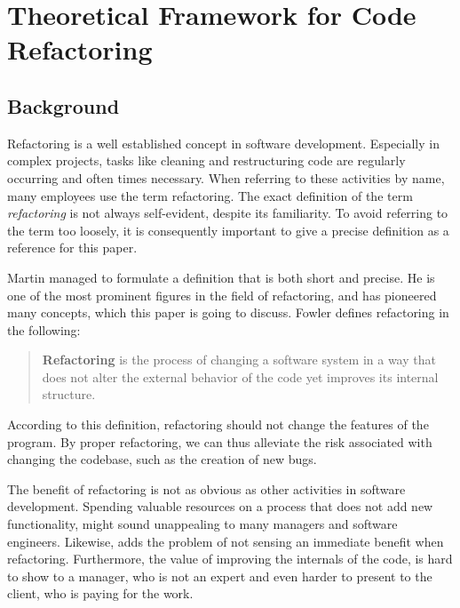 \chapter{Theoretical Framework for Code Refactoring}

\section{Background}


Refactoring is a well established concept in software development.
Especially in complex projects, 
	tasks like cleaning and restructuring code are regularly occurring and often times necessary. 
When referring to these activities by name, many employees use the term refactoring. 
The exact definition of the term \emph{refactoring} is not always self-evident,
	despite its familiarity.
To avoid referring to the term too loosely, 
	it is consequently important to give a precise definition as a reference for this paper. 

Martin \textcite[p. ~xiv]{fowler2018} managed to formulate a definition that is both short and precise. 
He is one of the most prominent figures in the field of refactoring, 
	and has pioneered many concepts, which this paper is going to discuss.
Fowler defines refactoring in the following:
\begin{quote}
\textbf{Refactoring} is the process of changing a software system in a way 
	that does not alter the external behavior of the code yet improves its internal structure.
\end{quote}

According to this definition, 
	refactoring should not change the features of the program.
By proper refactoring, 
	we can thus alleviate the risk associated with changing the codebase, 
    such as the creation of new bugs.



\clearpage
{}

The benefit of refactoring is not as obvious as other activities in software development. 
Spending valuable resources on a process that does not add new functionality, 
	might sound unappealing to many managers and software engineers.
Likewise, \textcite[p.~1]{kim2012} adds the problem of not sensing an immediate benefit when refactoring.
Furthermore, the value of improving the internals of the code, is hard to show to a manager, 
	who is not an expert and even harder to present to the client, who is paying for the work.

